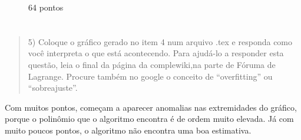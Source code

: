 \documentclass[brazilian,12pt,a4paper,final]{article}
\begin{document}
\begin{figure}[htbp]
\begin{center}
\caption{64 pontos}
\label{fig_rotacao}
\end{center}
\end{figure}

\section{}
\begin{quote}
5) Coloque o gráfico gerado no item 4 num arquivo .tex e responda como você interpreta o que está acontecendo.
Para ajudá-lo a responder esta questão, leia o final da página da complewiki,na parte de Fóruma de Lagrange.
Procure também no google o conceito de ``overfitting'' ou ``sobreajuste''.
\end{quote}
Com muitos pontos, começam a aparecer anomalias nas extremidades do gráfico,
porque o polinômio que o algoritmo encontra é de ordem muito elevada.
Já com muito poucos pontos, o algoritmo não encontra uma boa estimativa.
\end{document}
